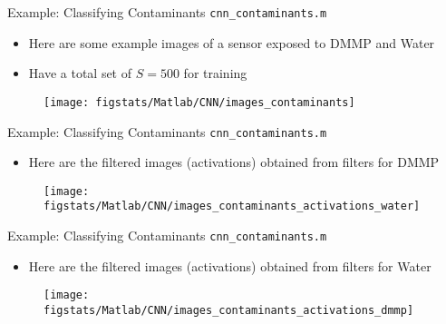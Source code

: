 \documentclass[handout,9pt]{beamer}
\begin{document}
\begin{frame}{Example: Classifying Contaminants \footnotesize{\texttt{cnn\_contaminants.m}}}

\begin{itemize}
\item Here are some example images of a sensor exposed to DMMP and Water 
\item Have a total set of $S=500$ for training 
\end{itemize}

\begin{figure}[!htb]
    \centering
\texttt{[image: figstats/Matlab/CNN/images\_contaminants]}
\end{figure}

\end{frame}


\begin{frame}{Example: Classifying Contaminants \footnotesize{\texttt{cnn\_contaminants.m}}}

\begin{itemize}
\item Here are the filtered images (activations) obtained from filters for DMMP
\end{itemize}

\begin{figure}[!htb]
    \centering
\texttt{[image: figstats/Matlab/CNN/images\_contaminants\_activations\_water]}
\end{figure}

\end{frame}

\begin{frame}{Example: Classifying Contaminants \footnotesize{\texttt{cnn\_contaminants.m}}}

\begin{itemize}
\item Here are the filtered images (activations) obtained from filters for Water
\end{itemize}

\begin{figure}[!htb]
    \centering
\texttt{[image: figstats/Matlab/CNN/images\_contaminants\_activations\_dmmp]}
\end{figure}

\end{frame}
\end{document}
